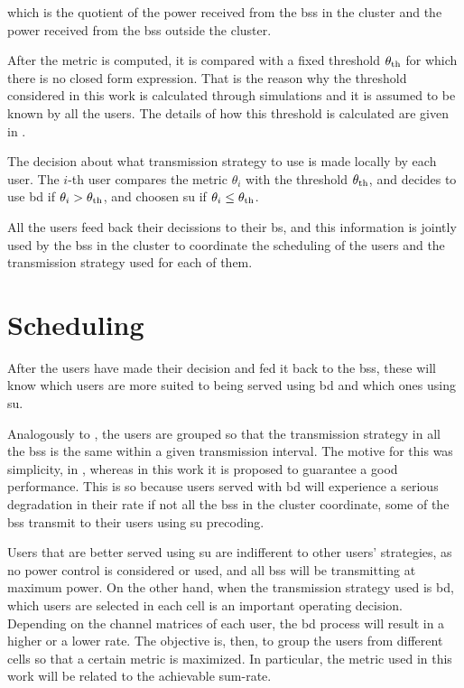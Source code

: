 \noindent
which is the quotient of the power received from the \glspl{bs} in the cluster
and the power received from the \glspl{bs} outside the cluster.

After the metric is computed, it is compared with a fixed threshold
$\theta_{\text{th}}$ for which there is no closed form expression. That is the
reason why the threshold considered in this work is calculated through
simulations and it is assumed to be known by all the users. The details of how
this threshold is calculated are given in .

The decision about what transmission strategy to use is made locally by each
user. The $i$-th user compares the metric $\theta_i$ with the threshold
$\theta_{\text{th}}$, and decides to use \gls{bd} if $\theta_i >
\theta_{\text{th}}$, and choosen \gls{su} if $\theta_i \leq \theta_{\text{th}}$.

All the users feed back their decissions to their \gls{bs}, and this information
is jointly used by the \glspl{bs} in the cluster to coordinate the scheduling of
the users and the transmission strategy used for each of them.

\section{Scheduling}\label{sec:sched_scheduling}

After the users have made their decision and fed it back to the \glspl{bs},
these will know which users are more suited to being served using \gls{bd} and
which ones using \gls{su}.

Analogously to \cite{moon13}, the users are grouped so that the transmission
strategy in all the \glspl{bs} is the same within a given transmission interval.
The motive for this was simplicity, in \cite{moon13}, whereas in this work it is
proposed to guarantee a good performance. This is so because users served with
\gls{bd} will experience a serious degradation in their rate if not all the
\glspl{bs} in the cluster coordinate, \ie some of the \glspl{bs} transmit to
their users using \gls{su} precoding.

Users that are better served using \gls{su} are indifferent to other users'
strategies, as no power control is considered or used, and all \glspl{bs} will
be transmitting at maximum power. On the other hand, when the transmission
strategy used is \gls{bd}, which users are selected in each cell is an important
operating decision. Depending on the channel matrices of each user, the \gls{bd}
process will result in a higher or a lower rate. The objective is, then, to
group the users from different cells so that a certain metric is maximized. In
particular, the metric used in this work will be related to the achievable
sum-rate.


